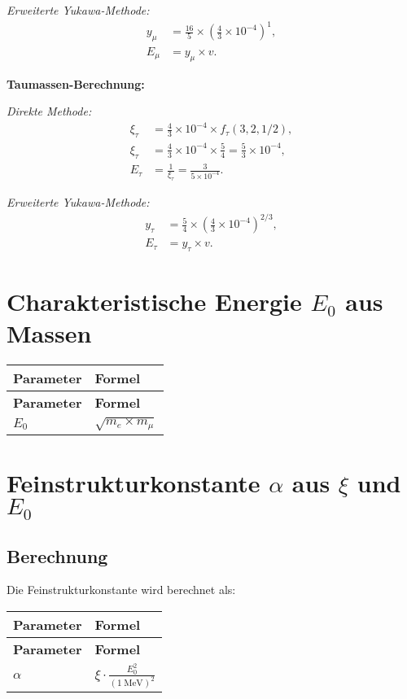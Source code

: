 \documentclass[12pt,a4paper]{article}
\begin{document}
	\textit{Erweiterte Yukawa-Methode:}
	\begin{align}
		y_\mu &= \frac{16}{5} \times \left(\frac{4}{3} \times 10^{-4}\right)^1, \\
		E_\mu &= y_\mu \times v.
	\end{align}
	
	\textbf{Taumassen-Berechnung:}
	
	\textit{Direkte Methode:}
	\begin{align}
		\xi_\tau &= \frac{4}{3} \times 10^{-4} \times f_\tau(3,2,1/2), \\
		\xi_\tau &= \frac{4}{3} \times 10^{-4} \times \frac{5}{4} = \frac{5}{3} \times 10^{-4}, \\
		E_{\tau} &= \frac{1}{\xi_\tau} = \frac{3}{5 \times 10^{-4}}.
	\end{align}
	
	\textit{Erweiterte Yukawa-Methode:}
	\begin{align}
		y_\tau &= \frac{5}{4} \times \left(\frac{4}{3} \times 10^{-4}\right)^{2/3}, \\
		E_\tau &= y_\tau \times v.
	\end{align}
	
	\section{Charakteristische Energie $E_0$ aus Massen}
	\begin{longtable}{|p{5cm}|p{6cm}|}
		\hline
		\textbf{Parameter} & \textbf{Formel} \\
		\hline
		\endfirsthead
		\hline
		\textbf{Parameter} & \textbf{Formel} \\
		\hline
		\endhead
		$E_0$ & $\sqrt{m_e \times m_{\mu}}$ \\
		\hline
	\end{longtable}
	
	\section{Feinstrukturkonstante $\alpha$ aus $\xi$ und $E_0$}
	\subsection{Berechnung}
	Die Feinstrukturkonstante wird berechnet als:
	\begin{longtable}{|p{5cm}|p{6cm}|}
		\hline
		\textbf{Parameter} & \textbf{Formel} \\
		\hline
		\endfirsthead
		\hline
		\textbf{Parameter} & \textbf{Formel} \\
		\hline
		\endhead
		$\alpha$ & $\xi \cdot \frac{E_0^2}{(1~\mathrm{MeV})^2}$ \\
		\hline
	\end{longtable}
	
\end{document}
